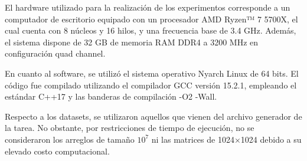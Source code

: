 El hardware utilizado para la realización de los experimentos corresponde a un computador de escritorio equipado con un procesador AMD Ryzen™ 7 5700X, el cual cuenta con 8 núcleos y 16 hilos, y una frecuencia base de 3.4 GHz. Además, el sistema dispone de 32 GB de memoria RAM DDR4 a 3200 MHz en configuración quad channel.

En cuanto al software, se utilizó el sistema operativo Nyarch Linux de 64 bits. El código fue compilado utilizando el compilador GCC versión 15.2.1, empleando el estándar C++17 y las banderas de compilación -O2 -Wall.

Respecto a los datasets, se utilizaron aquellos que vienen del archivo generador de la tarea. No obstante, por restricciones de tiempo de ejecución, no se consideraron los arreglos de tamaño 
$10^7$ ni las matrices de 1024×1024 debido a su elevado costo computacional.
\newpage